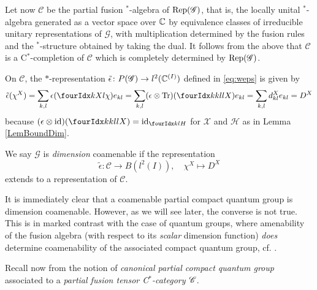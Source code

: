 Let now $\mathscr{C}$ be the partial fusion $^*$-algebra of $\mathrm{Rep}(\mathscr{G})$, that is, the locally unital $^*$-algebra generated as a vector space over $\mathbb{C}$ by equivalence classes of irreducible unitary representations of $\mathscr{G}$, with multiplication determined by the fusion rules and the $^*$-structure obtained by taking the dual. It follows from the above that $\mathcal{C}$ is a C$^*$-completion of $\mathscr{C}$ which is completely determined by $\mathrm{Rep}(\mathscr{G})$.

On $\mathscr{C}$, the $*$-representation $\operatorname{\tilde{\epsilon}} \colon P(\mathscr{G})
\to l^{2}(\mathbb{C}^{(I)})$ defined in
\eqref{eq:weps} is given by
\begin{align*}
  \weps(\chi^{X}) = \sum_{k,l} \epsilon(\Gr{\chi}{}{X}{k}{l})e_{kl} =
  \sum_{k,l} (\epsilon \otimes \Tr)(\Gr{X}{k}{l}{k}{l}) e_{kl}
   = \sum_{k,l} d^{X}_{kl} e_{kl} =D^{X}
\end{align*}
because $(\epsilon \otimes
\id)(\Gr{X}{k}{l}{k}{l})=\id_{\Gru{H}{k}{l}}$  for   $\mathscr{X}$ and
$\mathcal{H}$ as in Lemma \ref{LemBoundDim}.



\begin{Def} We say $\mathscr{G}$ is \emph{dimension} coamenable %
if the representation \[\tilde{\epsilon}: \mathscr{C} \rightarrow B(l^2(I)), \quad \chi^X \mapsto D^X\] extends to a representation of $\mathcal{C}$.
\end{Def}

It is immediately clear that a coamenable partial compact quantum group is dimension coamenable. However, as we will see later, the converse is not true. This is in marked contrast with the case of quantum groups, where amenability of the fusion algebra (with respect to its \emph{scalar} dimension function) \emph{does} determine coamenability of the associated compact quantum group, cf. \cite[Theorem 4.5]{Kye1}.
 

Recall now from \cite[Definition 1.23 and Section 4.1]{DCT1} the notion of \emph{canonical partial compact quantum group} associated to a \emph{partial fusion tensor C$^*$-category $\mathscr{C}$}.

